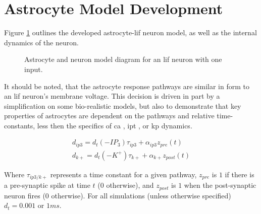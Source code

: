 \documentclass[conference]{IEEEtran}
\newcommand{\ca}{\gls{ca}\textrm{ }}
\newcommand{\ipt}{\gls{ipt}\textrm{ }}
\newcommand{\kp}{\gls{kp}\textrm{ }}
\newcommand{\asvgf}[4]{
	\begin{figure}[!htbp]
    	\centering
		\adjustbox{max width=#4\linewidth}{}
        \caption{#2.}
        \label{#3}
	\end{figure}
}
\begin{document}

\section{Astrocyte Model Development}
Figure \ref{fig:1n1s1a_fn_diagram} outlines the developed astrocyte-\gls{lif} neuron
model, as well as the internal dynamics of the neuron.

\asvgf{figures/1n1s1a_diagram.svg}{Astrocyte and neuron model diagram for an \gls{lif}
  neuron with one input}{fig:1n1s1a_fn_diagram}{0.9}

It should be noted, that the astrocyte response pathways are similar in form to
an \gls{lif} neuron's membrane voltage. This decision is driven in part by a
simplification on some bio-realistic models, but also to demonstrate that key
properties of astrocytes are dependent on the pathways and relative
time-constants, less then the specifics of \ca, \ipt, or \kp dynamics.

\begin{align}
  d_{ip3} = d_t (-IP_3)\tau_{ip3} + \alpha_{ip3} z_{pre}(t) \label{eq:astro:spike-ip3} \\
  d_{k+} = d_t (-K^+)\tau_{k+} + \alpha_{k+} z_{post}(t) \label{eq:astro:spike-k+}
\end{align}

Where $\tau_{ip3/k+}$ represents a time constant for a given pathway, $z_{pre}$
is $1$ if there is a pre-synaptic spike at time $t$ ($0$ otherwise), and
$z_{post}$ is $1$ when the post-synaptic neuron fires ($0$ otherwise). For all
simulations (unless otherwise specified) $d_t = 0.001$ or $1ms$.
\end{document}
